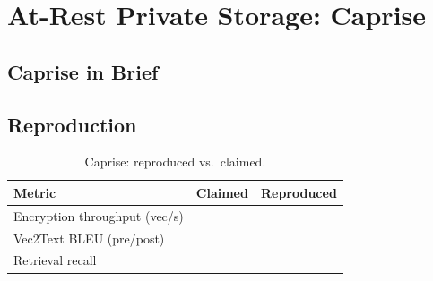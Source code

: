 \section{At-Rest Private Storage: Caprise}
\label{sec:caprise}


\subsection{Caprise in Brief}

\subsection{Reproduction}
\begin{table}[t]
  \centering
  \caption{Caprise: reproduced vs.\ claimed.}
  \label{tab:caprise-repro}
  \begin{tabular}{@{}lrr@{}}
    \toprule
    Metric & Claimed & Reproduced \\
    \midrule
    Encryption throughput (vec/s) & \needswork{} & \needswork{} \\
    Vec2Text BLEU (pre/post)      & \needswork{} & \needswork{} \\
    Retrieval recall              & \needswork{} & \needswork{} \\
    \bottomrule
  \end{tabular}
\end{table}
